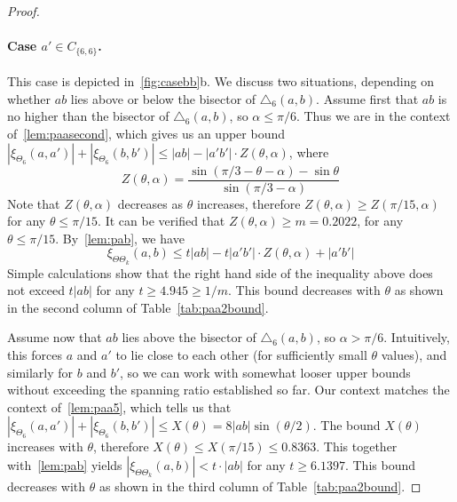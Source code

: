 \documentclass[runningheads,a4paper]{llncs}
\newcommand{\pp}{\xi}
\begin{document}
\begin{proof}
\paragraph{Case $a' \in C_{\{6,6\}}$.} This case is depicted in~\autoref{fig:casebb}b. We discuss two situations, depending on whether $ab$ lies above or below the bisector of $\triangle_6(a, b)$. Assume first that $ab$ is no higher than the bisector of $\triangle_6(a, b)$, so $\alpha \le \pi/6$. Thus we are in the context of~\autoref{lem:paasecond}, which gives us an upper bound  
$|\pp_{\Theta_6}(a, a')| + |\pp_{\Theta_6}(b, b')|  \le |ab| - |a'b'|\cdot Z(\theta, \alpha)$, where 
\begin{equation*}
Z(\theta,\alpha)  = \frac{\sin(\pi/3-\theta-\alpha)-\sin\theta}{\sin(\pi/3-\alpha)}
\end{equation*}
Note that $Z(\theta,\alpha)$ decreases as $\theta$ increases, therefore $Z(\theta,\alpha) \ge Z(\pi/15, \alpha)$ for any $\theta \le \pi/15$. It can be verified that $Z(\theta,\alpha) \ge m = 0.2022$, for any $\theta \le \pi/15$. 
By~\autoref{lem:pab}, we have 
\[
\pp_{\Theta\Theta_k}(a, b) \le t|ab|-t|a'b'|\cdot Z(\theta,\alpha) +|a'b'|
\] 
Simple calculations show that the right hand side of the inequality above does not exceed $t|ab|$ for any $t \ge 4.945 \ge 1/m$. This bound decreases with $\theta$ as shown in the second column of Table~\ref{tab:paa2bound}. 

Assume now that $ab$ lies above the bisector of $\triangle_6(a, b)$, so $\alpha > \pi/6$. Intuitively, this forces $a$ and $a'$ to lie close to each other (for sufficiently small $\theta$ values), and similarly for $b$ and $b'$, so we can work with somewhat looser upper bounds without exceeding the spanning ratio established so far. Our context matches the context of~\autoref{lem:paa5}, which tells us that $|\pp_{\Theta_6}(a, a')| + |\pp_{\Theta_6}(b, b')| \le X(\theta) = 8|ab|\sin(\theta/2)$. The bound $X(\theta)$ increases with $\theta$, therefore $X(\theta) \le X(\pi/15) \le 0.8363$.  This together with~\autoref{lem:pab} yields 
$|\pp_{\Theta\Theta_k}(a, b)|  < t \cdot |ab|$ for any $t \ge 6.1397$. 
This bound decreases with $\theta$ as shown in the third column of Table~\ref{tab:paa2bound}. 





\end{proof}
\end{document}
